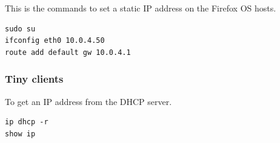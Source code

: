 \documentclass[11pt,parskip=half]{scrartcl}
\begin{document}
This is the commands to set a static IP address on the Firefox OS hosts.

\begin{verbatim}
sudo su
ifconfig eth0 10.0.4.50
route add default gw 10.0.4.1
\end{verbatim}

\subsubsection{{\bfseries\sffamily } Tiny clients}
\label{sec:orgdc14fee}

To get an IP address from the DHCP server.

\begin{verbatim}
ip dhcp -r
show ip
\end{verbatim}
\end{document}

